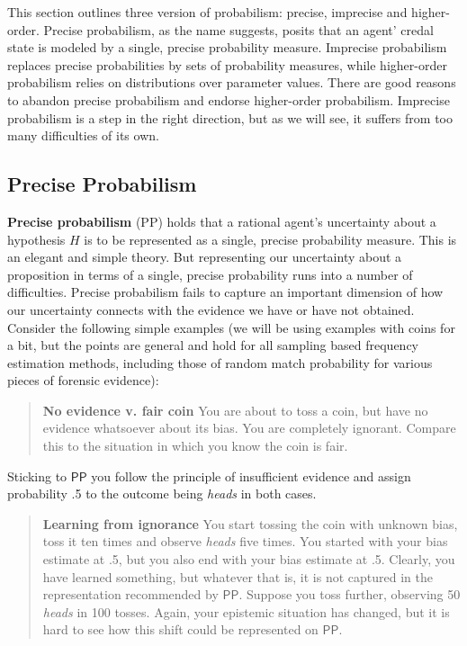\documentclass[
  10pt,
  dvipsnames,enabledeprecatedfontcommands]{scrartcl}
\newcommand{\s}[1]{\mbox{$\mathsf{#1}$}}
\begin{document}
This section outlines three version of probabilism: precise, imprecise
and higher-order. Precise probabilism, as the name suggests, posits that
an agent' credal state is modeled by a single, precise probability
measure. Imprecise probabilism replaces precise probabilities by sets of
probability measures, while higher-order probabilism relies on
distributions over parameter values. There are good reasons to abandon
precise probabilism and endorse higher-order probabilism. Imprecise
probabilism is a step in the right direction, but as we will see, it
suffers from too many difficulties of its own.

\hypertarget{precise-probabilism}{%
\subsection{Precise Probabilism}\label{precise-probabilism}}

\textbf{Precise probabilism} (\textsf{PP}) holds that a rational agent's
uncertainty about a hypothesis \(H\) is to be represented as a single,
precise probability measure. This is an elegant and simple theory. But
representing our uncertainty about a proposition in terms of a single,
precise probability runs into a number of difficulties. Precise
probabilism fails to capture an important dimension of how our
uncertainty connects with the evidence we have or have not obtained.
Consider the following simple examples (we will be using examples with
coins for a bit, but the points are general and hold for all sampling
based frequency estimation methods, including those of random match
probability for various pieces of forensic evidence):

\begin{quote}
\textbf{No evidence v. fair coin}
You are about to toss a coin, but have no evidence 
whatsoever about its bias. You are completely ignorant.   Compare this to the situation  in which you know the coin is fair. 
\end{quote}


\noindent Sticking to \s{PP} you follow the principle of insufficient
evidence and assign probability .5 to the outcome being \emph{heads} in
both cases.

\begin{quote}
\textbf{Learning from ignorance}
You start  tossing the  coin with unknown bias, toss it ten times and observe \emph{heads} five times. You started with your bias estimate at .5, but you also end with your bias estimate at .5. Clearly, you have learned something, but whatever that is, it is not captured in the representation recommended by \s{PP}. Suppose you toss further, observing 50 \emph{heads} in 100 tosses. Again, your epistemic situation has changed, but it is hard to see how this shift could be represented on \s{PP}.
\end{quote}
\end{document}

